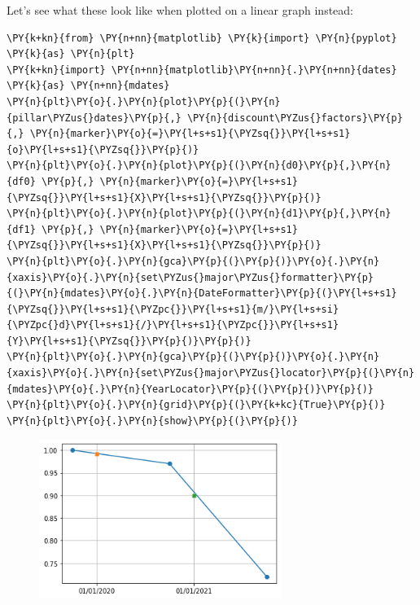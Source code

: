Let's see what these look like when plotted on a linear graph instead:
    
\begin{tcolorbox}[breakable, size=fbox, boxrule=1pt, pad at break*=1mm,colback=cellbackground, colframe=cellborder]
\begin{Verbatim}[commandchars=\\\{\}]
\PY{k+kn}{from} \PY{n+nn}{matplotlib} \PY{k}{import} \PY{n}{pyplot} \PY{k}{as} \PY{n}{plt}
\PY{k+kn}{import} \PY{n+nn}{matplotlib}\PY{n+nn}{.}\PY{n+nn}{dates} \PY{k}{as} \PY{n+nn}{mdates}
\PY{n}{plt}\PY{o}{.}\PY{n}{plot}\PY{p}{(}\PY{n}{pillar\PYZus{}dates}\PY{p}{,} \PY{n}{discount\PYZus{}factors}\PY{p}{,} \PY{n}{marker}\PY{o}{=}\PY{l+s+s1}{\PYZsq{}}\PY{l+s+s1}{o}\PY{l+s+s1}{\PYZsq{}}\PY{p}{)}
\PY{n}{plt}\PY{o}{.}\PY{n}{plot}\PY{p}{(}\PY{n}{d0}\PY{p}{,}\PY{n}{df0} \PY{p}{,} \PY{n}{marker}\PY{o}{=}\PY{l+s+s1}{\PYZsq{}}\PY{l+s+s1}{X}\PY{l+s+s1}{\PYZsq{}}\PY{p}{)}
\PY{n}{plt}\PY{o}{.}\PY{n}{plot}\PY{p}{(}\PY{n}{d1}\PY{p}{,}\PY{n}{df1} \PY{p}{,} \PY{n}{marker}\PY{o}{=}\PY{l+s+s1}{\PYZsq{}}\PY{l+s+s1}{X}\PY{l+s+s1}{\PYZsq{}}\PY{p}{)}
\PY{n}{plt}\PY{o}{.}\PY{n}{gca}\PY{p}{(}\PY{p}{)}\PY{o}{.}\PY{n}{xaxis}\PY{o}{.}\PY{n}{set\PYZus{}major\PYZus{}formatter}\PY{p}{(}\PY{n}{mdates}\PY{o}{.}\PY{n}{DateFormatter}\PY{p}{(}\PY{l+s+s1}{\PYZsq{}}\PY{l+s+s1}{\PYZpc{}}\PY{l+s+s1}{m/}\PY{l+s+si}{\PYZpc{}d}\PY{l+s+s1}{/}\PY{l+s+s1}{\PYZpc{}}\PY{l+s+s1}{Y}\PY{l+s+s1}{\PYZsq{}}\PY{p}{)}\PY{p}{)}
\PY{n}{plt}\PY{o}{.}\PY{n}{gca}\PY{p}{(}\PY{p}{)}\PY{o}{.}\PY{n}{xaxis}\PY{o}{.}\PY{n}{set\PYZus{}major\PYZus{}locator}\PY{p}{(}\PY{n}{mdates}\PY{o}{.}\PY{n}{YearLocator}\PY{p}{(}\PY{p}{)}\PY{p}{)}
\PY{n}{plt}\PY{o}{.}\PY{n}{grid}\PY{p}{(}\PY{k+kc}{True}\PY{p}{)}
\PY{n}{plt}\PY{o}{.}\PY{n}{show}\PY{p}{(}\PY{p}{)}
\end{Verbatim}
\end{tcolorbox}
\vfill
\begin{figure}[h]
  \centering
  \includegraphics[width=0.7\textwidth]{lecture_3_16_0.png}
\end{figure}

